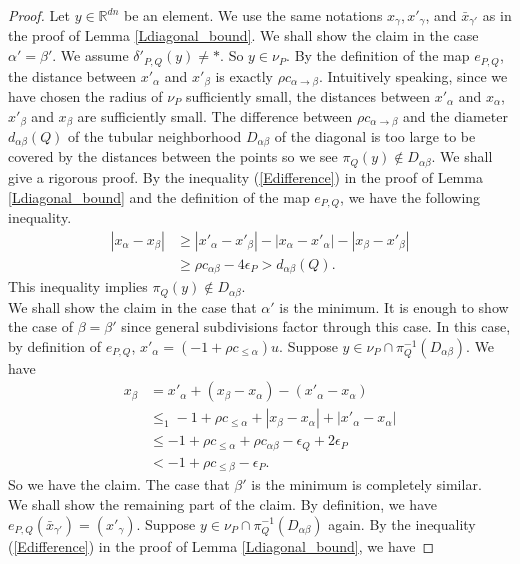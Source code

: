 \documentclass[reqno]{amsart}
\theoremstyle{definition}
\theoremstyle{plain}
\newcommand{\eps}{\epsilon}
\newcommand{\RR}{\mathbb{R}}
\begin{document}
\begin{proof}
Let $y\in \RR^{dn}$ be an element. We use the same notations $ x_\gamma, x'_\gamma$, and $\bar x_{\gamma'}$ as in the proof of Lemma  \ref{Ldiagonal_bound}.
 We shall show the claim in the case $\alpha'=\beta'$. We assume $\delta'_{P,Q}(y)\not =*$. So $y\in \nu_P$. By the definition of the map $e_{P,Q}$, the distance between $x'_\alpha$ and $x'_\beta$ is exactly $\rho c_{\alpha\to\beta}$. Intuitively speaking, since we have chosen the radius of $\nu_P$ sufficiently small, the distances between $x'_\alpha$ and $x_\alpha$, $x'_\beta$ and $x_\beta$ are sufficiently small. The difference between  $\rho c_{\alpha\to\beta}$ and the diameter $d_{\alpha\beta}(Q)$ of the tubular neighborhood $D_{\alpha\beta}$ of the diagonal is too large to be covered by the distances between the points so we see $\pi_Q(y)\not \in D_{\alpha\beta}$. We shall give a rigorous proof.
By the inequality (\ref{Edifference}) in the proof of Lemma  \ref{Ldiagonal_bound} and the definition of the map $e_{P,Q}$, we have the following inequality.
\[
\begin{split}
|x_\alpha-x_\beta| & \geq |x'_\alpha-x'_\beta|-|x_\alpha-x'_\alpha|-|x_\beta-x'_\beta| \\
                          & \geq \rho c_{\alpha\beta}-4\eps_P>d_{\alpha\beta}(Q).
\end{split}
\]
This inequality implies $\pi_{Q}(y)\not\in D_{\alpha\beta}$. \\
\indent We shall show the claim in the case that $\alpha'$ is the minimum. It is enough to show the case of $\beta=\beta'$ since general subdivisions factor through this case. In this case, by definition of $e_{P,Q}$, $x'_\alpha=(-1+\rho c_{\leq \alpha})u$. Suppose $y\in \nu_P\cap \pi_Q^{-1}(D_{\alpha\beta})$. We have 
\[
\begin{split}
x_\beta&=  x'_\alpha+(x_\beta-x_\alpha)-(x'_\alpha-x_\alpha) \\
 &\leq _1-1+\rho c_{\leq \alpha} +|x_\beta-x_\alpha|+|x'_\alpha-x_\alpha| \\
&\leq -1+\rho c_{\leq \alpha}+\rho c_{\alpha\beta}-\eps_Q+2\eps_P \\
&< -1 +\rho c_{\leq \beta}-\eps_P.
\end{split}
\]
So we have the claim. The case that $\beta'$ is the minimum is completely similar.\\
 We shall show the remaining part of the claim. 
 By definition, we have $e_{P,Q}(\bar x_{\gamma'})=(x'_\gamma)$. Suppose $y\in \nu_P\cap \pi_Q^{-1}(D_{\alpha\beta})$ again. By the inequality (\ref{Edifference}) in the proof of Lemma  \ref{Ldiagonal_bound}, we have

\end{proof}
\end{document}
